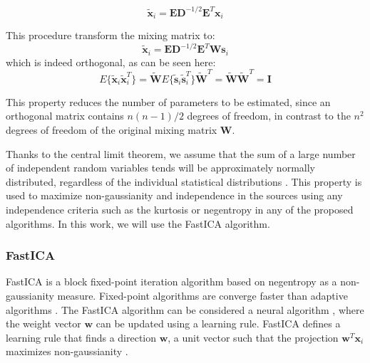\begin{equation}
\tilde{\mathbf{x}}_i= \mathbf{E}\mathbf{D}^{-1/2}\mathbf{E}^T\mathbf{x}_i
\end{equation}

This procedure transform the mixing matrix to:
\begin{equation}
\tilde{\mathbf{x}}_i = \mathbf{E}\mathbf{D}^{-1/2}\mathbf{E}^T \mathbf{W}\mathbf{s}_i
\end{equation}
which is indeed orthogonal, as can be seen here:
\begin{equation}
 E\{\tilde{\mathbf{x}}_i\tilde{\mathbf{x}}_i^T\} = \tilde{\mathbf{W}} E\{\tilde{\mathbf{s}}_i\tilde{\mathbf{s}}_i^T\}\tilde{\mathbf{W}}^T 	=\tilde{\mathbf{W}}\tilde{\mathbf{W}}^T=\mathbf{I}
\end{equation}
 
This property reduces the number of parameters to be estimated, since an orthogonal matrix contains $n(n-1)/2$ degrees of freedom, in contrast to the $n^2$ degrees of freedom of the original mixing matrix $\mathbf{W}$. 

Thanks to the central limit theorem, we assume that the sum of a large number of independent random variables tends will be approximately normally distributed, regardless of the individual statistical distributions \cite{Rice2006}. This property is used to maximize non-gaussianity and independence in the sources using any independence criteria such as the kurtosis or negentropy in any of the proposed algorithms. In this work, we will use the FastICA algorithm. 

\subsubsection{FastICA}
FastICA is a block fixed-point iteration algorithm \cite{Oja1997,FastICA99} based on negentropy as a non-gaussianity measure. Fixed-point algorithms are converge faster than adaptive algorithms \cite{FastICA99}. The FastICA algorithm can be considered a neural algorithm \cite{Hyvarinen2000}, where the weight vector $\mathbf{w}$ can be updated using a learning rule. FastICA defines a learning rule that finds a direction $\mathbf{w}$, a unit vector such that the projection $\mathbf{w}^T\mathbf{x}_i$ maximizes non-gaussianity \cite{FastICA99}. 

